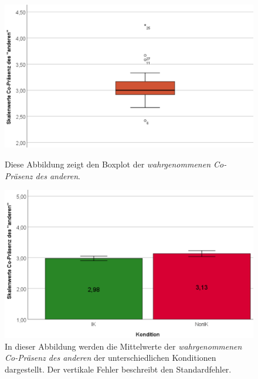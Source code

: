 \documentclass[a4paper,11pt]{article}%
\renewcommand{\\}{\vspace*{0.5\baselineskip} \newline}
\begin{document}
	\begin{figure}[H]
   \begin{minipage}[t]{.5\linewidth} %
      \includegraphics[width=\linewidth]{Abbildungen/AuswertungDiagramme/BP_OtherCoPresence.png}
      \caption[Boxplot der selbst wahrgenommenen Co-Präsenz des anderen]{Diese Abbildung zeigt den Boxplot der \textit{wahrgenommenen Co-Präsenz des anderen}.}
            \label{SD_OtherCoPresenceBP}
   \end{minipage}
   \hspace{.02\linewidth}%
   \begin{minipage}[t]{.5\linewidth} %
     \includegraphics[width=\linewidth]{Abbildungen/AuswertungDiagramme/SD_OtherCoPresence_Mittelwerte.png}
      \caption[Durchschnittliche \textit{wahrgenommene Co-Präsenz des anderen} der Konditionen]{In dieser Abbildung werden die Mittelwerte der \textit{wahrgenommenen Co-Präsenz des anderen} der unterschiedlichen Konditionen dargestellt. Der vertikale Fehler beschreibt den Standardfehler.}
       \label{SD_SelbstCoPresence_Mittelwerte}
   \end{minipage}
\end{figure}
\end{document}
